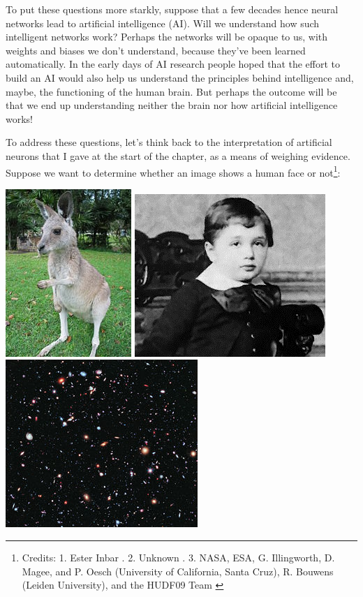 To put these questions more starkly, suppose that a few decades hence neural networks lead to artificial intelligence (AI). Will we understand how such intelligent networks work? Perhaps the networks will be opaque to us, with weights and biases we don't understand, because they've been learned automatically. In the early days of AI research people hoped that the effort to build an AI would also help us understand the principles behind intelligence and, maybe, the functioning of the human brain. But perhaps the outcome will be that we end up understanding neither the brain nor how artificial intelligence works!

To address these questions, let's think back to the interpretation of artificial neurons that I gave at the start of the chapter, as a means of weighing evidence. Suppose we want to determine whether an image shows a human face or not\footnote{Credits: 1. Ester Inbar \cite{wikipediakangeroo2019}. 2. Unknown \cite{wikipediaeinsteinaged32019}. 3. NASA, ESA, G. Illingworth, D. Magee, and P. Oesch (University of California, Santa Cruz), R. Bouwens (Leiden University), and the HUDF09 Team \cite{wikipediahubblexdeepfield2019}}:


{\centering
\includegraphics[height=0.3\textwidth,]{pic/Kangaroo.JPG}
\includegraphics[height=0.3\textwidth,]{pic/Einstein_crop.jpg}
\includegraphics[height=0.3\textwidth,]{pic/hubble.jpg}
\par}

